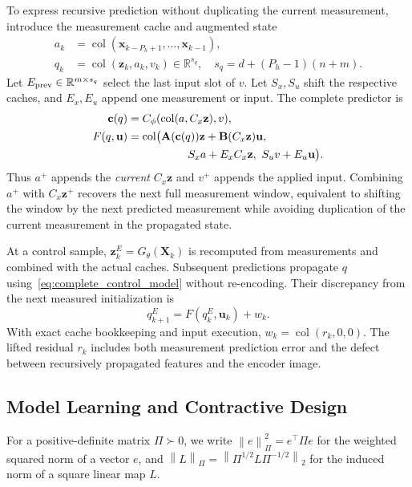\documentclass[journal]{IEEEtran}
\newcommand{\vx}{\mathbf{x}}
\newcommand{\vu}{\mathbf{u}}
\newcommand{\vz}{\mathbf{z}}
\newcommand{\vc}{\mathbf{c}}
\newcommand{\mA}{\mathbf{A}}
\newcommand{\mB}{\mathbf{B}}
\newcommand{\mX}{\mathbf{X}}
\newcommand{\R}{\mathbb{R}}
\newcommand{\norm}[1]{\left\lVert #1\right\rVert}
\newcommand{\col}{\operatorname{col}}
\begin{document}
To express recursive prediction without duplicating the current measurement, introduce the measurement cache and augmented state
\begin{equation}
\begin{split}
a_k&=\col(\vx_{k-P_h+1},\ldots,\vx_{k-1}),\\
q_k&=\col(\vz_k,a_k,v_k)\in\R^{s_q},\quad
s_q=d+(P_h-1)(n+m).
\end{split}
\label{eq:augmented_state}
\end{equation}
Let $E_{\rm prev}\in\R^{m\times s_q}$ select the last input slot of $v$. Let $S_x,S_u$ shift the respective caches, and $E_x,E_u$ append one measurement or input. The complete predictor is
\begin{equation}
\begin{split}
\vc(q)&=C_\phi(\col(a,C_x\vz),v),\\
F(q,\vu)&=\col\bigl(\mA(\vc(q))\vz+\mB(C_x\vz)\vu,\\
&\hspace{19mm}S_xa+E_xC_x\vz,\ S_uv+E_u\vu\bigr).
\end{split}
\label{eq:complete_control_model}
\end{equation}
Thus $a^+$ appends the \emph{current} $C_x\vz$ and $v^+$ appends the applied input. Combining $a^+$ with $C_x\vz^+$ recovers the next full measurement window, equivalent to shifting the window by the next predicted measurement while avoiding duplication of the current measurement in the propagated state.

At a control sample, $\vz_k^E=G_\theta(\mX_k)$ is recomputed from measurements and combined with the actual caches. Subsequent predictions propagate $q$ using~\eqref{eq:complete_control_model} without re-encoding. Their discrepancy from the next measured initialization is
\begin{equation}
q_{k+1}^E=F(q_k^E,\vu_k)+w_k.
\label{eq:residual_definition}
\end{equation}
With exact cache bookkeeping and input execution, $w_k=\col(r_k,0,0)$. The lifted residual $r_k$ includes both measurement prediction error and the defect between recursively propagated features and the encoder image.

\subsection{Model Learning and Contractive Design}
\label{sec:training}
For a positive-definite matrix $\Pi\succ0$, we write $\norm{e}_\Pi^2=e^\top\Pi e$ for the weighted squared norm of a vector $e$, and $\norm{L}_\Pi=\norm{\Pi^{1/2}L\Pi^{-1/2}}_2$ for the induced norm of a square linear map $L$.
\end{document}
